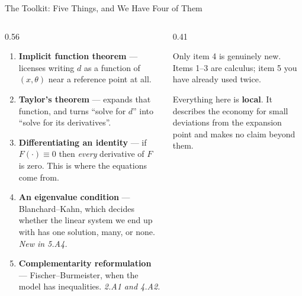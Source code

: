 \begin{frame}{The Toolkit: Five Things, and We Have Four of Them}
\begin{columns}[T]
\begin{column}{0.56\textwidth}
\small
\begin{enumerate}\setlength{\itemsep}{1.5mm}
  \item \textbf{Implicit function theorem} --- licenses writing $d$ as a function of $(x,\theta)$ near a reference point at all.
  \item \textbf{Taylor's theorem} --- expands that function, and turns ``solve for $d$'' into ``solve for its derivatives''.
  \item \textbf{Differentiating an identity} --- if $F(\cdot)\equiv 0$ then \emph{every} derivative of $F$ is zero. This is where the equations come from.
  \item \textbf{An eigenvalue condition} --- Blanchard--Kahn, which decides whether the linear system we end up with has one solution, many, or none. \emph{New in 5.A4.}
  \item \textbf{Complementarity reformulation} --- Fischer--Burmeister, when the model has inequalities. \emph{2.A1 and 4.A2.}
\end{enumerate}
\end{column}
\begin{column}{0.41\textwidth}
\begin{takeawaybox}\footnotesize
Only item 4 is genuinely new. Items 1--3 are calculus; item 5 you have already used twice.
\end{takeawaybox}
\medskip
\begin{cautionbox}\footnotesize
Everything here is \textbf{local}. It describes the economy for small deviations from the expansion point and makes no claim beyond them.
\end{cautionbox}
\end{column}
\end{columns}
\vspace{1mm}
\end{frame}

